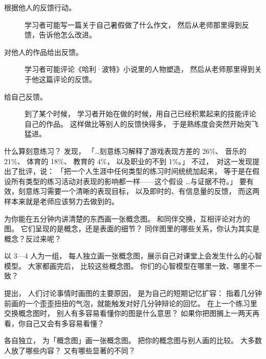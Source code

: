 \begin{description}

\item[根据他人的反馈行动。]
  学习者可能写一篇关于自己暑假做了什么作文，
  然后从老师那里得到反馈，告诉他怎么改进。

\item[对他人的作品给出反馈。]
  学习者可能评论《哈利·波特》小说里的人物塑造，
  然后从老师那里得到关于他这篇评论的反馈。

\item[给自己反馈。]
  到了某个时候，
  学习者开始在做的时候，用自己已经积累起来的技能评论自己的作品。
  这样做比等别人的反馈快得多，
  于是熟练度会突然开始突飞猛进。

\end{description}

\begin{aside}{什么算刻意练习？}
  \cite{Macn2014}发现，
  「{\ldots}刻意练习解释了游戏表现方差的 26\%、
  音乐的 21\%、
  体育的 18\%、
  教育的 4\%，
  以及职业的不到 1\%。」
  不过，~\cite{Eric2016}对这一发现提出了批评，说：
  「把一个人生涯中任何类型的练习时间统统加起来，
  等于是在假设所有类型的练习活动对表现的影响都一样——这个假设
  {\ldots}与证据不符。」
  要有效，刻意练习需要一个清晰的表现目标，
  以及即时的、有信息量的反馈，
  而这两样本来就是老师应该努力去做到的。
\end{aside}



为你能在五分钟内讲清楚的东西画一张概念图。
和同伴交换，互相评论对方的图。
它们呈现的是概念，还是表面的细节？
同伴图里的哪些关系，你认为其实是概念？反过来呢？


以 3—4 人为一组，
每人独立画一张概念图，展示自己对课堂上会发生什么的心智模型。
大家都画完后，
比较这些概念图。
你们的心智模型在哪里一致、哪里不一致？


\cite{Cher2007}提出，
人们讨论事情时画图的主要原因，
是为自己的短期记忆扩容：
指着几分钟前画的一个歪歪扭扭的气泡，就能触发对好几分钟辩论的回忆。
在上一个练习里交换概念图时，
别人有多容易看懂你的图是什么意思？
如果你把图搁上一两天再看，你自己又会有多容易看懂？


各自独立，
为「概念图」画一张概念图。
把你的概念图与别人画的比较。
大多数人放了哪些内容？
又有哪些显著的不同？


